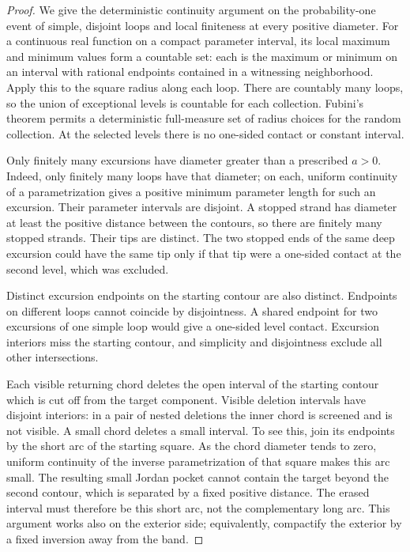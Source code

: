 \documentclass[11pt]{article}
\theoremstyle{definition}
\theoremstyle{remark}
\numberwithin{equation}{section}
\begin{document}
\begin{proof}
We give the deterministic continuity argument on the probability-one
event of simple, disjoint loops and local finiteness at every positive
diameter.  For a continuous real function on a compact parameter
interval, its local maximum and minimum values form a countable set:
each is the maximum or minimum on an interval with rational endpoints
contained in a witnessing neighborhood.  Apply this to the square
radius along each loop.  There are countably many loops, so the union
of exceptional levels is countable for each collection.  Fubini's
theorem permits a deterministic full-measure set of radius choices for
the random collection.  At the selected levels there is no one-sided
contact or constant interval.

Only finitely many excursions have diameter greater than a prescribed
$a>0$.  Indeed, only finitely many loops have that diameter; on each,
uniform continuity of a parametrization gives a positive minimum
parameter length for such an excursion.  Their parameter intervals
are disjoint.  A stopped strand has diameter at least the positive
distance between the contours, so there are finitely many stopped
strands.  Their tips are distinct.  The two stopped ends of the same
deep excursion could have the same tip only if that tip were a
one-sided contact at the second level, which was excluded.

Distinct excursion endpoints on the starting contour are also
distinct.  Endpoints on different loops cannot coincide by
disjointness.  A shared endpoint for two excursions of one simple
loop would give a one-sided level contact.  Excursion interiors miss
the starting contour, and simplicity and disjointness exclude all
other intersections.

Each visible returning chord deletes the open interval of the starting
contour which is cut off from the target component.  Visible deletion
intervals have disjoint interiors: in a pair of nested deletions the
inner chord is screened and is not visible.  A small chord deletes a
small interval.  To see this, join its endpoints by the short arc of
the starting square.  As the chord diameter tends to zero, uniform
continuity of the inverse parametrization of that square makes this
arc small.  The resulting small Jordan pocket cannot contain the
target beyond the second contour, which is separated by a fixed
positive distance.  The erased interval must therefore be this short
arc, not the complementary long arc.  This argument works also on
the exterior side; equivalently, compactify the exterior by a fixed
inversion away from the band.


\end{proof}
\end{document}
